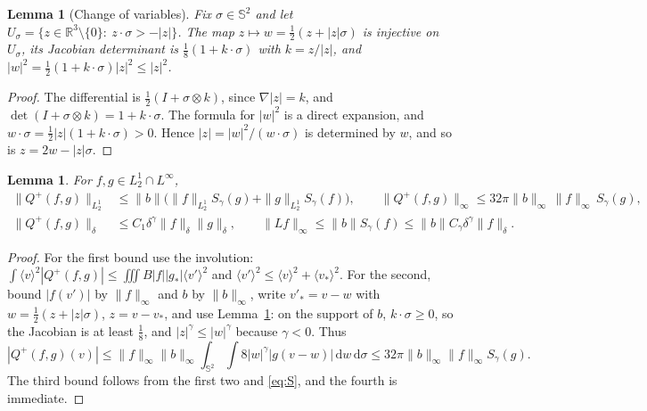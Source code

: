 \documentclass[11pt]{amsart}
\newtheorem{lemma}[theorem]{Lemma}
\theoremstyle{definition}
\newcommand{\RR}{\mathbb{R}}
\newcommand{\Sph}{\mathbb{S}}
\newcommand{\dd}{\,\mathrm{d}}
\newcommand{\jb}[1]{\langle #1\rangle}
\newcommand{\nb}{\|b\|}
\newcommand{\nbi}{\|b\|_\infty}
\begin{document}
\begin{lemma}[Change of variables]\label{lem:jac}
Fix $\sigma\in\Sph^2$ and let $U_\sigma=\{z\in\RR^3\setminus\{0\}:\ z\cdot\sigma>-|z|\}$. The map $z\mapsto w=\frac12(z+|z|\sigma)$ is injective on $U_\sigma$, its Jacobian determinant is $\frac18(1+k\cdot\sigma)$ with $k=z/|z|$, and $|w|^2=\frac12(1+k\cdot\sigma)|z|^2\le|z|^2$.
\end{lemma}

\begin{proof}
The differential is $\frac12(I+\sigma\otimes k)$, since $\nabla|z|=k$, and $\det(I+\sigma\otimes k)=1+k\cdot\sigma$. The formula for $|w|^2$ is a direct expansion, and $w\cdot\sigma=\frac12|z|(1+k\cdot\sigma)>0$. Hence $|z|=|w|^2/(w\cdot\sigma)$ is determined by $w$, and so is $z=2w-|z|\sigma$.
\end{proof}

\begin{lemma}\label{lem:Qplus}
For $f,g\in L^1_2\cap L^\infty$,
\begin{align*}
\|Q^+(f,g)\|_{L^1_2}&\le\nb\big(\|f\|_{L^1_2}S_\gamma(g)+\|g\|_{L^1_2}S_\gamma(f)\big),\qquad
\|Q^+(f,g)\|_\infty\le32\pi\nbi\,\|f\|_\infty\,S_\gamma(g),\\
\|Q^+(f,g)\|_\delta&\le C_1\delta^\gamma\|f\|_\delta\|g\|_\delta,\qquad \|Lf\|_\infty\le\nb S_\gamma(f)\le\nb C_\gamma\delta^\gamma\|f\|_\delta .
\end{align*}
\end{lemma}

\begin{proof}
For the first bound use the involution: $\int\jb{v}^2|Q^+(f,g)|\le\iiint B|f||g_*|\jb{v'}^2$ and $\jb{v'}^2\le\jb{v}^2+\jb{v_*}^2$. For the second, bound $|f(v')|$ by $\|f\|_\infty$ and $b$ by $\nbi$, write $v'_*=v-w$ with $w=\frac12(z+|z|\sigma)$, $z=v-v_*$, and use Lemma~\ref{lem:jac}: on the support of $b$, $k\cdot\sigma\ge0$, so the Jacobian is at least $\frac18$, and $|z|^\gamma\le|w|^\gamma$ because $\gamma<0$. Thus
\[
|Q^+(f,g)(v)|\le\|f\|_\infty\nbi\int_{\Sph^2}\int8|w|^\gamma|g(v-w)|\dd w\dd\sigma\le32\pi\nbi\|f\|_\infty S_\gamma(g).
\]
The third bound follows from the first two and \eqref{eq:S}, and the fourth is immediate.
\end{proof}
\end{document}
